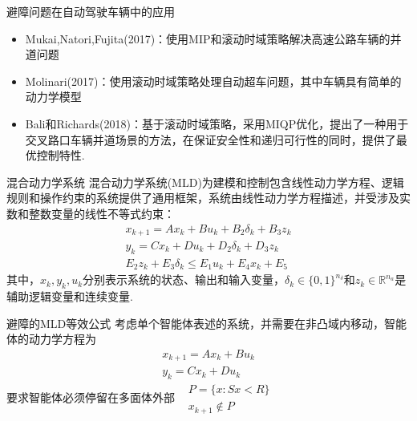 \documentclass[notheorems,11pt]{beamer}
\theoremstyle{plain}
\numberwithin{theorem}{section}
\numberwithin{lemma}{section}
\numberwithin{corollary}{section}
\theoremstyle{example}
\begin{document}
\begin{frame}{避障问题在自动驾驶车辆中的应用}
\begin{itemize}
  \item Mukai,Natori,Fujita(2017)：使用MIP和滚动时域策略解决高速公路车辆的并道问题
  \item Molinari(2017)：使用滚动时域策略处理自动超车问题，其中车辆具有简单的动力学模型
  \item Bali和Richards(2018)：基于滚动时域策略，采用MIQP优化，提出了一种用于交叉路口车辆并道场景的方法，在保证安全性和递归可行性的同时，提供了最优控制特性.
\end{itemize}
\end{frame}

\begin{frame}{混合动力学系统}
  混合动力学系统(MLD)为建模和控制包含线性动力学方程、逻辑规则和操作约束的系统提供了通用框架，系统由线性动力学方程描述，并受涉及实数和整数变量的线性不等式约束：
  \begin{subequations}
    \begin{gather}
      x_{k+1}=Ax_k+Bu_k+B_2\delta_k+B_3z_k \label{26a}\\
      y_k=Cx_k+Du_k+D_2\delta_k+D_3z_k \\
      E_2z_k+E_3\delta_k\leqslant E_1u_k+E_4x_k+E_5
    \end{gather}
  \end{subequations}
  其中，$x_k,y_k,u_k$分别表示系统的状态、输出和输入变量，$\delta_k\in\{0,1\}^{n_\delta}$和$z_k\in\mathbb{R}^{n_a}$是辅助逻辑变量和连续变量.
\end{frame}

\begin{frame}{避障的MLD等效公式}
  考虑单个智能体表述的系统，并需要在非凸域内移动，智能体的动力学方程为
  \begin{subequations}
    \begin{gather}
      x_{k+1}=Ax_k+Bu_k \label{27a}\\
      y_k=Cx_k+Du_k \label{27b}
    \end{gather}
  \end{subequations}
  要求智能体必须停留在多面体外部$\begin{aligned}
    &P=\{x:Sx<R\} \\
    &x_{k+1}\notin P
  \end{aligned}$
\end{frame}
\end{document}
